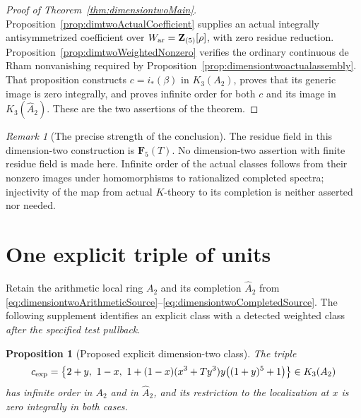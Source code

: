 \documentclass[11pt,a4paper]{article}
\newtheorem{proposition}[theorem]{Proposition}
\theoremstyle{remark}
\newtheorem{remark}[theorem]{Remark}
\begin{document}
\begin{proof}[Proof of Theorem~\ref{thm:dimensiontwoMain}]
Proposition~\ref{prop:dimtwoActualCoefficient} supplies an actual
integrally antisymmetrized coefficient over
$W_{\rm ar}=\mathbf Z_{(5)}[\rho]$, with zero residue reduction.
Proposition~\ref{prop:dimtwoWeightedNonzero} verifies the ordinary
continuous de Rham nonvanishing required by
Proposition~\ref{prop:dimensiontwoactualassembly}.
That proposition constructs $c=i_*(\beta)$ in $K_3(A_2)$, proves that its
generic image is zero integrally, and proves infinite order for
both $c$ and its image in $K_3(\widehat A_2)$.
These are the two assertions of the theorem.
\end{proof}

\begin{remark}[The precise strength of the conclusion]
The residue field in this dimension-two construction is
$\mathbf F_5(T)$.  No dimension-two assertion with finite residue
field is made here.  Infinite order of the actual classes follows
from their nonzero images under homomorphisms to rationalized
completed spectra; injectivity of the map from actual $K$-theory
to its completion is neither asserted nor needed.
\end{remark}



\section{One explicit triple of units}
\label{sec:dimtwoExplicitTriple}

Retain the arithmetic local ring $A_2$ and its completion $\widehat A_2$
from \eqref{eq:dimensiontwoArithmeticSource}--\eqref{eq:dimensiontwoCompletedSource}.
The following supplement identifies an explicit class with a detected
weighted class \emph{after the specified test pullback}.

\begin{proposition}[Proposed explicit dimension-two class]
\label{prop:dimtwoExplicitTriple}
The triple
\begin{equation}\label{eq:dimtwoExplicitTriple}
 c_{\rm exp}=\left\{2+y,\ 1-x,\
 1+(1-x)(x^3+Ty^3)y\bigl((1+y)^5+1\bigr)\right\}\in K_3(A_2)
\end{equation}
has infinite order in $A_2$ and in $\widehat A_2$, and its
restriction to the localization at $x$ is zero integrally in both cases.
\end{proposition}
\end{document}
